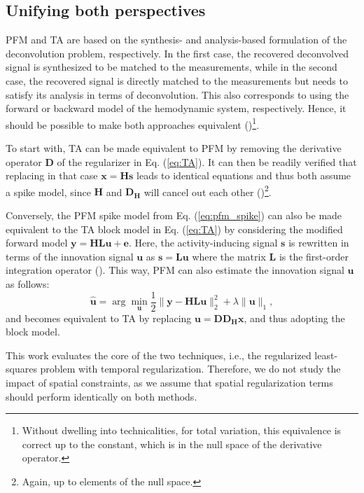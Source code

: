 \subsection{Unifying both perspectives}

PFM and TA are based on the synthesis- and analysis-based formulation of the deconvolution problem, respectively. In the first case, the recovered deconvolved signal is synthesized to be matched to the measurements, while in the second case, the recovered signal is directly matched to the measurements but needs to satisfy its analysis in terms of deconvolution. This also corresponds to using the forward or backward model of the hemodynamic system, respectively. Hence, it should be possible to make both approaches equivalent (\citealt{Elad2007Analysisversussynthesis})\footnote{Without dwelling into technicalities, for total variation, this equivalence is correct up to the constant, which is in the null space of the derivative operator.}.

To start with, TA can be made equivalent to PFM by removing the derivative operator $\mathbf{D}$ of the regularizer in Eq. (\ref{eq:TA}). It can then be readily verified that replacing in that case $\mathbf{x}=\mathbf{Hs}$ leads to identical equations and thus both assume a spike model, since $\mathbf{H}$ and $\mathbf{D_H}$ will cancel out each other (\citealt{Karahanoglu2011SignalProcessingApproach})\footnote{Again, up to elements of the null space.}.

Conversely, the PFM spike model from Eq. (\ref{eq:pfm_spike}) can also be made equivalent to the TA block model in Eq. (\ref{eq:TA}) by considering the modified forward model $\mathbf{y} = \mathbf{H L u} + \mathbf{e}$. Here, the activity-inducing signal $\mathbf{s}$ is rewritten in terms of the innovation signal $\mathbf{u}$ as $\mathbf{s}=\mathbf{Lu}$ where the matrix $\mathbf{L}$ is the first-order integration operator (\citealt{Cherkaoui2019SparsitybasedBlind,Urunuela2020StabilityBasedSparse}). This way, PFM can also estimate the innovation signal $\mathbf{u}$ as follows: 
\begin{equation}
    \label{eq:pfm_block}
    \hat{\mathbf{u}} = \arg \min_{\mathbf{u}} \frac{1}{2} \| \mathbf{y} - \mathbf{HLu} \|_2^2 + \lambda \| \mathbf{u} \|_1,
\end{equation}
and becomes equivalent to TA by replacing $\mathbf{u}=\mathbf{D D_H x}$, and thus adopting the block model.

This work evaluates the core of the two techniques, i.e., the regularized least-squares problem with temporal regularization. Therefore, we do not study the impact of spatial constraints, as we assume that spatial regularization terms should perform identically on both methods.

